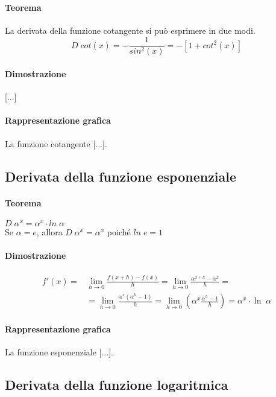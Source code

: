 \documentclass[a4paper,14pt]{extarticle}
\begin{document}
\paragraph{Teorema \\} La derivata della funzione cotangente si può esprimere in due modi. \large \[ D\;cot(x) = -\frac{1}{sin^2(x)} = -[1+cot^2(x)] \] \normalsize
\paragraph{Dimostrazione \\} [...]
\paragraph{Rappresentazione grafica \\}
La funzione cotangente [...].

\subsection{Derivata della funzione esponenziale}
\paragraph{Teorema \\} $D\;\alpha^x = \alpha^x \cdot ln\;\alpha$ \\ Se $\alpha = e$, allora $D\;\alpha^x = \alpha^x$ poiché $ln\;e = 1$
\paragraph{Dimostrazione \\}
\large
\begin{equation} \label{eq_derivata_esponenziale}
\begin{split}
f'(x) = & \lim_{h\to0}\frac{f(x+h)-f(x)}{h} = \lim_{h\to0}\frac{\alpha^{x+h}-\alpha^x}{h} = \\ & = \lim_{h\to0}\frac{\alpha^x(\alpha^h-1)}{h} = \lim_{h\to0}(\alpha^x\frac{\alpha^h-1}{h}) = \alpha^x \cdot \ln\;\alpha
\end{split}
\end{equation}
\normalsize
\paragraph{Rappresentazione grafica \\}
La funzione esponenziale [...].

\subsection{Derivata della funzione logaritmica}
\end{document}
